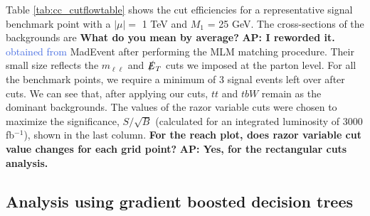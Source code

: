 \documentclass[a4paper,11pt]{article}
\newcommand{\Shufang}[1]{{\bf\color{Maroon}  #1}}
\newcommand{\Adarsh}[1]{{\bf\color{RoyalBlue} AP: #1}}
\newcommand{\ap}[1]{\textcolor{RoyalBlue}{#1}}
\begin{document}
Table \ref{tab:cc_cutflowtable} shows the cut efficiencies for a representative
signal benchmark point with a $|\mu| =$ 1 TeV and $M_1$ = 25 GeV.   The
cross-sections of the backgrounds are \Shufang{What do you mean by average?}
\Adarsh{I reworded it.}
\ap{obtained from} MadEvent after performing the MLM matching procedure. Their small size reflects
the $m_{\ell\ell}$ and $\slashed{E}_T$ cuts we imposed at the parton level. For all
the benchmark points, we require a minimum of 3 signal events left over after
cuts. We can see that, after applying our cuts, $tt$ and $tbW$ remain as the
dominant backgrounds. The values of the razor variable cuts were chosen to
maximize the significance, $S/\sqrt{B}$ (calculated for an integrated luminosity
of 3000 fb$^{-1}$), shown in the last column.  \Shufang{For the reach plot,
does razor variable cut value changes for each grid point?} \Adarsh{Yes, for
the rectangular cuts analysis.}

\subsection{Analysis using gradient boosted decision trees}\label{subsec:bdt}
\end{document}
